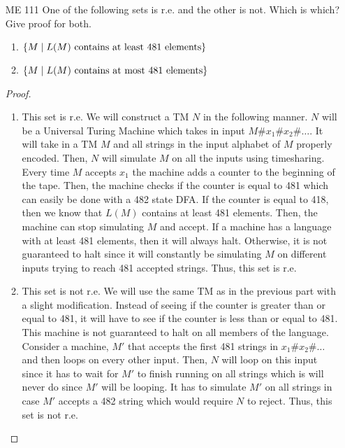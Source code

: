 \documentclass{article}
\newcommand{\setst}{\hspace{1mm} | \hspace{1mm} }
\theoremstyle{definition}
\begin{document}
\begin{enumerate}
\begin{proof}
		To see closure under intersection, we will construct an almost identical TM, $M_i$ to the one in the previous part. Again, it will simulate $M_A$ and $M_B$ using timesharing. The only difference is that $M_i$ will only accept on $x$ when both $M_A$ and $M_B$ would have accepted $x$. 
	\end{proof}
	\item[ME 111] One of the following sets is r.e. and the other is not. Which is which?
	Give proof for both.
	\begin{enumerate}
		\item $\{M \setst L(M) \text{ contains at least 481 elements}\}$
		\item $\{M \setst L(M) \text{ contains at most 481 elements}\}$
	\end{enumerate}
	\begin{proof}
		\leavevmode
		\begin{enumerate}
			\item This set is r.e. We will construct a TM $N$ in the following manner. $N$ will be a Universal Turing Machine which takes in input $M\#x_1\#x_2\#\ldots$. It will take in a TM $M$ and all strings in the input alphabet of $M$ properly encoded. Then, $N$ will simulate $M$ on all the inputs using timesharing. Every time $M$ accepts $x_1$ the machine adds a counter to the beginning of the tape. Then, the machine checks if the counter is equal to 481 which can easily be done with a 482 state DFA. If  the counter is equal to 418, then we know that $L(M)$ contains at least 481 elements. Then, the machine can stop simulating $M$ and accept. If a machine has a language with at least 481 elements, then it will always halt. Otherwise, it is not guaranteed to halt since it will constantly be simulating $M$ on different inputs trying to reach 481 accepted strings. Thus, this set is r.e.
			\item This set is not r.e. We will use the same TM as in the previous part with a slight modification. Instead of seeing if the counter is greater than or equal to 481, it will have to see if the counter is less than or equal to 481. This machine is not guaranteed to halt on all members of the language. Consider a machine, $M'$ that accepts the first 481 strings in $x_1\#x_2\#\ldots$ and then loops on every other input. Then, $N$ will loop on this input since it has to wait for $M'$ to finish running on all strings which is will never do since $M'$ will be looping. It has to simulate $M'$ on all strings in case $M'$ accepts a 482 string which would require $N$ to reject. Thus, this set is not r.e.
		\end{enumerate}
	\end{proof}
\end{enumerate}
\end{document}
